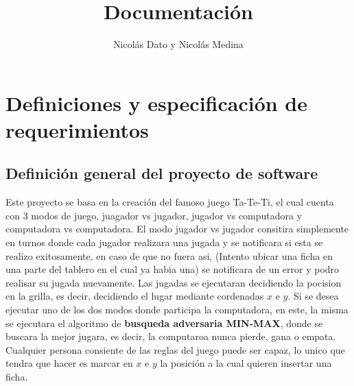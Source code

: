 \documentclass[12pt,twocolum,a4paper]{article}
\title{Documentaci\'on}
\author{Nicol\'as Dato y Nicol\'as Medina }
\date{}
\begin{document}
\maketitle

\newpage
\tableofcontents
\newpage

\section{Definiciones y especificaci\'on de \newline requerimientos}

\subsection{Definici\'on general del proyecto de software}
\begin{frame}
    Este proyecto se basa en la creaci\'on del famoso juego Ta-Te-Ti, el cual cuenta con 3 modos de juego, juagador vs jugador, jugador vs computadora y computadora vs computadora.
    \newline
    El modo jugador vs jugador consitira simplemente en turnos donde cada jugador realizara una jugada y se notificara si esta se realizo exitosamente, en caso de que no fuera asi, (Intento ubicar una ficha en una parte del tablero en el cual ya habia una) se notificara de un error y podro realisar su jugada nuevamente. Las jugadas se ejecutaran decidiendo la pocision en la grilla, es decir, decidiendo el lugar mediante cordenadas $x$ e $y$.
    \newline
    Si se desea ejecutar uno de los dos modos donde participa la computadora, en este, la misma se ejecutara el algoritmo de {\bf busqueda adversaria \newline MIN-MAX}, donde se buscara la mejor jugara, es decir, la computaroa nunca pierde, gana o empata.
    \newline
    Cualquier persona consiente de las reglas del juego puede ser capaz, lo unico que tendra que hacer es marcar en $x$ e $y$ la posici\'on a la cual quieren insertar una ficha.
\end{frame}
\end{document}

